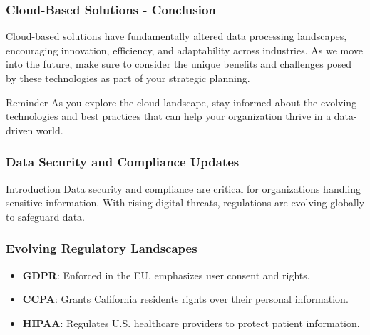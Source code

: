 \documentclass{beamer}
\begin{document}
\begin{frame}[fragile]
    \frametitle{Cloud-Based Solutions - Conclusion}
    Cloud-based solutions have fundamentally altered data processing landscapes, encouraging innovation, efficiency, and adaptability across industries. 
    As we move into the future, make sure to consider the unique benefits and challenges posed by these technologies as part of your strategic planning.
    
    \begin{block}{Reminder}
        As you explore the cloud landscape, stay informed about the evolving technologies and best practices that can help your organization thrive in a data-driven world.
    \end{block}
\end{frame}

\begin{frame}[fragile]
    \frametitle{Data Security and Compliance Updates}
    \begin{block}{Introduction}
        Data security and compliance are critical for organizations handling sensitive information. 
        With rising digital threats, regulations are evolving globally to safeguard data.
    \end{block}
\end{frame}

\begin{frame}[fragile]
    \frametitle{Evolving Regulatory Landscapes}
    \begin{itemize}
        \item \textbf{GDPR}: Enforced in the EU, emphasizes user consent and rights.
        \item \textbf{CCPA}: Grants California residents rights over their personal information.
        \item \textbf{HIPAA}: Regulates U.S. healthcare providers to protect patient information.
    \end{itemize}
\end{frame}
\end{document}
